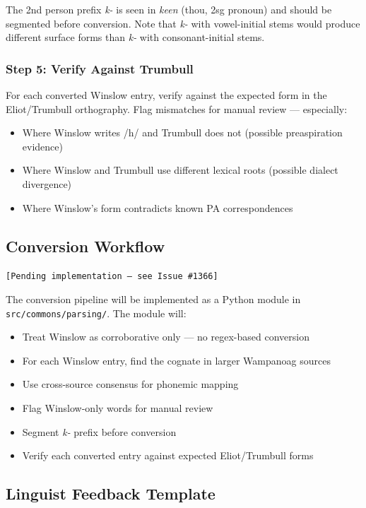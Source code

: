 The 2nd person prefix \emph{k-} is seen in \emph{keen} (thou, 2sg pronoun) and
should be segmented before conversion. Note that \emph{k-} with vowel-initial
stems would produce different surface forms than \emph{k-} with consonant-initial
stems.

\subsubsection{Step 5: Verify Against Trumbull}

For each converted Winslow entry, verify against the expected form in the
Eliot/Trumbull orthography. Flag mismatches for manual review --- especially:
\begin{itemize}
  \item Where Winslow writes /h/ and Trumbull does not (possible preaspiration
    evidence)
  \item Where Winslow and Trumbull use different lexical roots (possible dialect
    divergence)
  \item Where Winslow's form contradicts known PA correspondences
\end{itemize}

\subsection{Conversion Workflow}
\texttt{[Pending implementation --- see Issue \#1366]}

The conversion pipeline will be implemented as a Python module in
\texttt{src/commons/parsing/}. The module will:

\begin{itemize}
  \item Treat Winslow as corroborative only --- no regex-based conversion
  \item For each Winslow entry, find the cognate in larger Wampanoag sources
  \item Use cross-source consensus for phonemic mapping
  \item Flag Winslow-only words for manual review
  \item Segment \emph{k-} prefix before conversion
  \item Verify each converted entry against expected Eliot/Trumbull forms
\end{itemize}

\subsection{Linguist Feedback Template}

